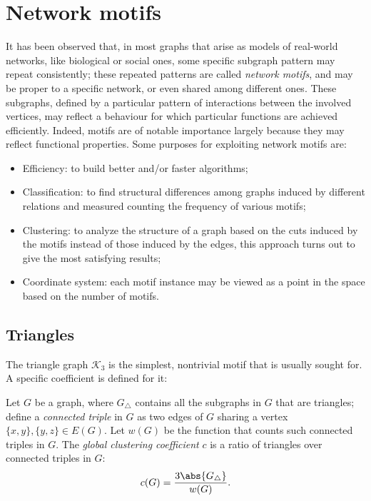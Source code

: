 \chapter{Network motifs}

It has been observed that, in most graphs that arise as models of real-world networks, like biological or social ones, some specific subgraph pattern may repeat consistently; these repeated patterns are called \emph{network motifs}, and  may be proper to a specific network, or even shared among different ones. These subgraphs, defined by a particular pattern of interactions between the involved vertices, may reflect a behaviour for which particular functions are achieved efficiently. Indeed, motifs are of notable importance largely because they may reflect functional properties. Some purposes for exploiting network motifs are:
   \begin{itemize}
       \item Efficiency: to build better and/or faster algorithms;
       \item Classification: to find structural differences among graphs induced by different relations and measured counting the frequency of various motifs;
       \item Clustering: to analyze the structure of a graph based on the cuts induced by the motifs instead of those induced by the edges, this approach turns out to give the most satisfying results;
       \item Coordinate system: each motif instance may be viewed as a point in the space based on the number of motifs.
   \end{itemize}

   
\section{Triangles}

The triangle graph $\mathcal{K}_3$ is the simplest, nontrivial motif that is usually sought for. A specific coefficient is defined for it:
\begin{definition}
    Let $G$ be a graph, where $G_\triangle$ contains all the subgraphs in $G$ that are triangles; define a \emph{connected triple} in $G$ as two edges of $G$ sharing a vertex $\{x, y\}, \{y, z\} \in E(G)$. Let $w(G)$ be the function that counts such connected triples in $G$. The \emph{global clustering coefficient} $c$ is a ratio of triangles over connected triples in $G$:
    \begin{equation}\label{eq:clustering-coefficient}
        c(G) = \frac{3 \abs{G_\triangle}}{w(G)}.
    \end{equation}
\end{definition}

